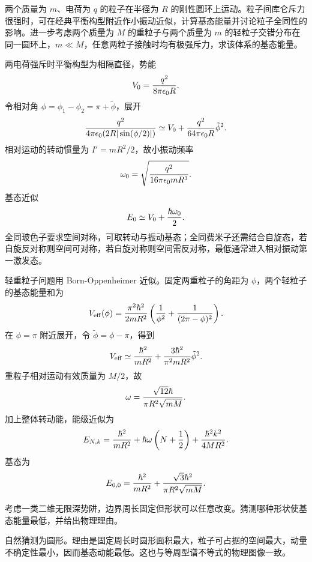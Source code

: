 \begin{question}
两个质量为 $m$、电荷为 $q$ 的粒子在半径为 $R$ 的刚性圆环上运动。粒子间库仑斥力很强时，可在经典平衡构型附近作小振动近似，计算基态能量并讨论粒子全同性的影响。进一步考虑两个质量为 $M$ 的重粒子与两个质量为 $m$ 的轻粒子交错分布在同一圆环上，$m\ll M$，任意两粒子接触时均有极强斥力，求该体系的基态能量。
\begin{solution}
两电荷强斥时平衡构型为相隔直径，势能
\[
  V_0={q^2\over 8\pi\epsilon_0R}.
\]
令相对角 $\phi=\phi_1-\phi_2=\pi+\tilde\phi$，展开
\[
  {q^2\over4\pi\epsilon_0(2R|\sin(\phi/2)|)}
  \simeq V_0+{q^2\over64\pi\epsilon_0R}\tilde\phi^2.
\]
相对运动的转动惯量为 $I'=mR^2/2$，故小振动频率
\[
  \omega_0=\sqrt{q^2\over16\pi\epsilon_0mR^3}.
\]
基态近似
\[
  E_0\simeq V_0+{\hbar\omega_0\over2}.
\]
全同玻色子要求空间对称，可取转动与振动基态；全同费米子还需结合自旋态，若自旋反对称则空间可对称，若自旋对称则空间需反对称，最低通常进入相对振动第一激发态。

轻重粒子问题用 Born-Oppenheimer 近似。固定两重粒子的角距为 $\phi$，两个轻粒子的基态能量和为
\[
  V_{\rm eff}(\phi)={\pi^2\hbar^2\over2mR^2}\left({1\over\phi^2}+{1\over(2\pi-\phi)^2}\right).
\]
在 $\phi=\pi$ 附近展开，令 $\tilde\phi=\phi-\pi$，得到
\[
  V_{\rm eff}\simeq {\hbar^2\over mR^2}+{3\hbar^2\over\pi^2mR^2}\tilde\phi^2.
\]
重粒子相对运动有效质量为 $M/2$，故
\[
  \omega={\sqrt{12}\hbar\over\pi R^2\sqrt{mM}}.
\]
加上整体转动能，能级近似为
\[
  E_{N,k}={\hbar^2\over mR^2}+\hbar\omega\left(N+{1\over2}\right)+{\hbar^2k^2\over4MR^2}.
\]
基态为
\[
  E_{0,0}={\hbar^2\over mR^2}+{\sqrt3\hbar^2\over\pi R^2\sqrt{mM}}.
\]
\end{solution}
\end{question}

\begin{question}
考虑一类二维无限深势阱，边界周长固定但形状可以任意改变。猜测哪种形状使基态能量最低，并给出物理理由。
\begin{solution}
自然猜测为圆形。理由是固定周长时圆形面积最大，粒子可占据的空间最大，动量不确定性最小，因而基态动能最低。这也与等周型谱不等式的物理图像一致。
\end{solution}
\end{question}
